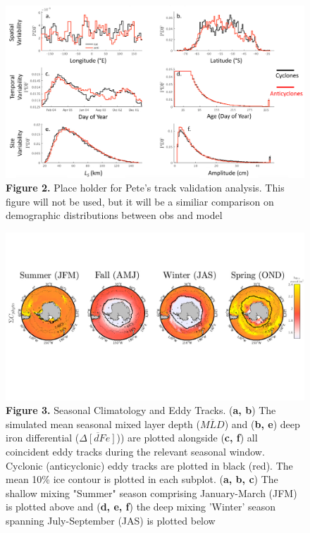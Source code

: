 
\begin{figure}[!htbp]
\begin{adjustwidth}{-1.2in}{-1.2in}
 \centering
 \includegraphics[scale=.40]{Fig2.png}
\end{adjustwidth}
\caption[Comparison of modeled and observed tracks and demographics]
{\textbf{Figure 2.} Place holder for Pete's track validation analysis. This figure will not be used, but it will be a similiar comparison on demographic distributions between obs and model}
\label{fig:Fig2}
\end{figure}



\begin{figure}[!htbp]
 \begin{adjustwidth}{-2in}{-1.2in}
 \centering
 \includegraphics[scale=.80]{Fig3.pdf}
 \end{adjustwidth}
\caption[Seasonal climatology and eddy tracks. ]
{\textbf{Figure 3.} Seasonal Climatology and Eddy Tracks. (\textbf{a, b}) The simulated mean seasonal mixed layer depth ($\overline{MLD}$) and (\textbf{b, e}) deep iron differential ($\overline{\Delta[dFe]}$)) are plotted alongside (\textbf{c, f}) all coincident eddy tracks during the relevant seasonal window. Cyclonic (anticyclonic) eddy tracks are plotted in black (red). The mean 10\% ice contour is plotted in each subplot. (\textbf{a, b, c}) The shallow mixing "Summer" season comprising January-March (JFM) is plotted above and (\textbf{d, e, f}) the deep mixing 'Winter' season spanning July-September (JAS) is plotted below}
\label{fig:Fig3}
\end{figure}


